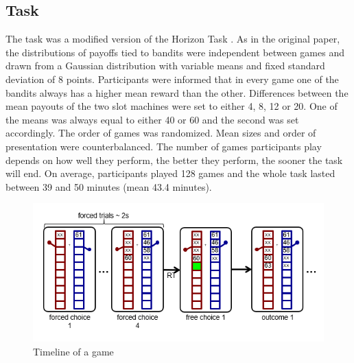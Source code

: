 \documentclass[12pt]{article}
\begin{document}
	
	\subsection*{Task}
	The task was a modified version of the Horizon Task \cite{}. As in the original paper, the distributions of payoffs tied to bandits were independent between games and drawn from a Gaussian distribution with variable means and fixed standard deviation of 8 points. Participants were informed that in every game one of the bandits always has a higher mean reward than the other. Differences between the mean payouts of the two slot machines were set to either 4, 8, 12 or 20. One of the means was always equal to either 40 or 60 and the second was set accordingly. The order of games was randomized. Mean sizes and order of presentation were counterbalanced. The number of games participants play depends on how well they perform, the better they perform, the sooner the task will end. On average, participants played 128 games and the whole task lasted between 39 and 50 minutes (mean 43.4 minutes). 
	
	\begin{figure}[H]
		\begin{center}
			\includegraphics[width=\textwidth]{figures/taskfig1.PNG}
			\caption{Timeline of a game}
			\label{fig:modelbased}
		\end{center}
	\end{figure}
	
\end{document}
